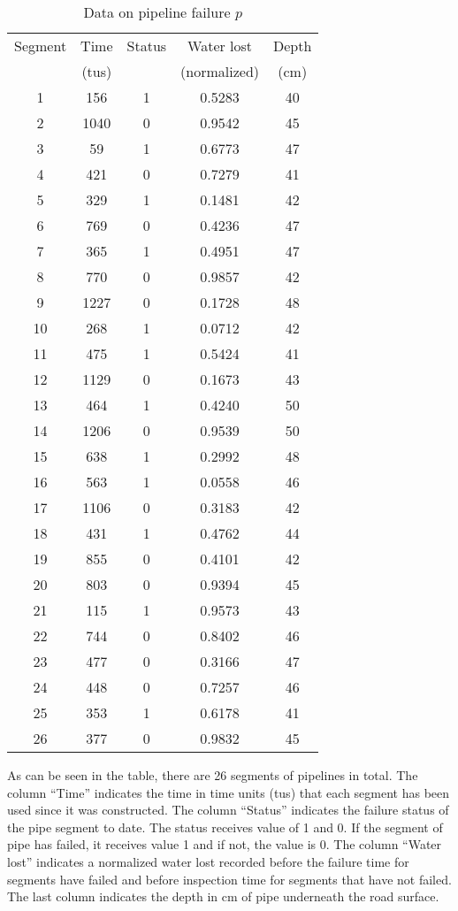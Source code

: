 \begin{table}
	\centering
	\caption{Data on pipeline failure $p$} \label{tblbayes3}
\begin{tabular}{|c|c|c|c|c|}
\hline
Segment & Time & Status & Water lost & Depth \\ 
 & (tus) &  & (normalized) & (cm) \\ 
\hline
1 & 156 & 1 & 0.5283 & 40 \\ 
\hline
2 & 1040 & 0 & 0.9542 & 45 \\ 
\hline
3 & 59 & 1 & 0.6773 & 47 \\ 
\hline
4 & 421 & 0 & 0.7279 & 41 \\ 
\hline
5 & 329 & 1 & 0.1481 & 42 \\ 
\hline
6 & 769 & 0 & 0.4236 & 47 \\ 
\hline
7 & 365 & 1 & 0.4951 & 47 \\ 
\hline
8 & 770 & 0 & 0.9857 & 42 \\ 
\hline
9 & 1227 & 0 & 0.1728 & 48 \\ 
\hline
10 & 268 & 1 & 0.0712 & 42 \\ 
\hline
11 & 475 & 1 & 0.5424 & 41 \\ 
\hline
12 & 1129 & 0 & 0.1673 & 43 \\ 
\hline
13 & 464 & 1 & 0.4240 & 50 \\ 
\hline
14 & 1206 & 0 & 0.9539 & 50 \\ 
\hline
15 & 638 & 1 & 0.2992 & 48 \\ 
\hline
16 & 563 & 1 & 0.0558 & 46 \\ 
\hline
17 & 1106 & 0 & 0.3183 & 42 \\ 
\hline
18 & 431 & 1 & 0.4762 & 44 \\ 
\hline
19 & 855 & 0 & 0.4101 & 42 \\ 
\hline
20 & 803 & 0 & 0.9394 & 45 \\ 
\hline
21 & 115 & 1 & 0.9573 & 43 \\ 
\hline
22 & 744 & 0 & 0.8402 & 46 \\ 
\hline
23 & 477 & 0 & 0.3166 & 47 \\ 
\hline
24 & 448 & 0 & 0.7257 & 46 \\ 
\hline
25 & 353 & 1 & 0.6178 & 41 \\ 
\hline
26 & 377 & 0 & 0.9832 & 45 \\ 
\hline
\end{tabular}
\end{table}

As can be seen in the table, there are 26 segments of pipelines in total. The column ``Time'' indicates the time in time units (tus) that each segment has been used since it was constructed. The column ``Status'' indicates the failure status of the pipe segment to date. The status receives value of 1 and 0. If the segment of pipe has failed, it receives value 1 and if not, the value is 0. The column ``Water lost'' indicates a normalized water lost recorded before the failure time for segments have failed and before inspection time for segments that have not failed. The last column indicates the depth in cm of pipe underneath the road surface.

